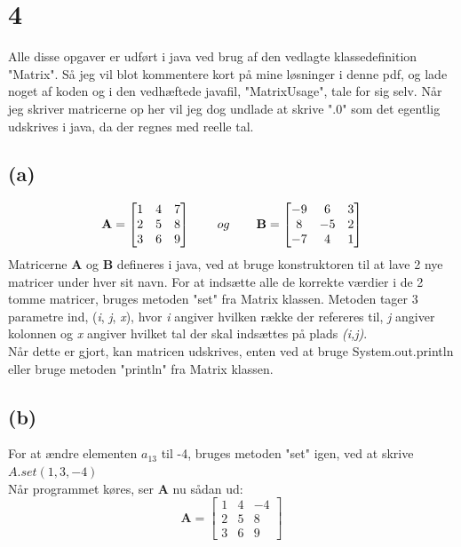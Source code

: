 \documentclass[12pt]{article}
\begin{document}
\section{4}
Alle disse opgaver er udført i java ved brug af den vedlagte klassedefinition "Matrix". Så jeg vil blot kommentere kort på mine løsninger i denne pdf, og lade noget af koden og i den vedhæftede javafil, "MatrixUsage", tale for sig selv.
Når jeg skriver matricerne op her vil jeg dog undlade at skrive ".0" som det egentlig udskrives i java, da der regnes med reelle tal.

\subsection{(a)}
$$
\mathbf{A}=
\begin{bmatrix}
1&4&7\\
2&5&8\\
3&6&9
\end{bmatrix} \hspace*{5ex} og \hspace*{5ex}
\mathbf{B}=
\begin{bmatrix}
-9&6&3\\
8&-5&2\\
-7&4&1
\end{bmatrix}
$$
Matricerne \textbf{A} og \textbf{B} defineres i java, ved at bruge konstruktoren til at lave 2 nye matricer under hver sit navn. For at indsætte alle de korrekte værdier i de 2 tomme matricer, bruges metoden "set" fra Matrix klassen. Metoden tager 3 parametre ind, (\textit{i}, \textit{j}, \textit{x}), hvor \textit{i} angiver hvilken række der refereres til, \textit{j} angiver kolonnen og \textit{x} angiver hvilket tal der skal indsættes på plads \textit{(i,j)}.\\
Når dette er gjort, kan matricen udskrives, enten ved at bruge System.out.println eller bruge metoden "println" fra Matrix klassen. 

\subsection{(b)}
For at ændre elementen $\mathit{a}_{13}$ til -4, bruges metoden "set" igen, ved at skrive $A.set(1,3,-4)$\\
Når programmet køres, ser \textbf{A} nu sådan ud:\\
$$
\mathbf{A}=
\begin{bmatrix}
1&4&-4\\
2&5&8\\
3&6&9
\end{bmatrix}
$$
\end{document}
